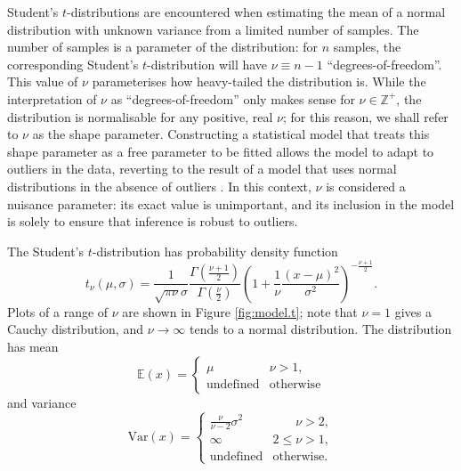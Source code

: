 \documentclass[fleqn,usenatbib]{mnras}
\newcommand{\studentt}[2]{t_\nu \left( #1, #2 \right)}
\begin{document}
Student's $t$-distributions are encountered when estimating the mean of a normal
distribution with unknown variance from a limited number of samples. The number
of samples is a parameter of the distribution: for $n$ samples, the
corresponding Student's $t$-distribution will have $\nu \equiv n - 1$
``degrees-of-freedom''. This value of $\nu$ parameterises how heavy-tailed the
distribution is. While the interpretation of $\nu$ as ``degrees-of-freedom''
only makes sense for $\nu \in \mathbb Z^+$, the distribution is normalisable for
any positive, real $\nu$; for this reason, we shall refer to $\nu$ as the shape
parameter. Constructing a statistical model that treats this shape parameter as
a free parameter to be fitted allows the model to adapt to outliers in the data,
reverting to the result of a model that uses normal distributions in the absence
of outliers \citep{Feeney:2018}. In this context, $\nu$ is considered a
nuisance parameter: its exact value is unimportant, and its inclusion in the
model is solely to ensure that inference is robust to outliers.

The Student's $t$-distribution has probability density function
\begin{equation}
    \studentt{\mu}{\sigma}
        =
    \frac{1}{\sqrt{\pi \nu} \sigma}
    \frac{
        \Gamma \left(\frac{\nu + 1}2\right)
    }{
        \Gamma \left(\frac{\nu}2\right)
    }
    \left(
        1 + \frac{1}{\nu} \frac{\left(x - \mu\right)^2}{\sigma^2}
    \right)^{
        -\frac{\nu + 1}{2}
    }.
\end{equation}
Plots of a range of $\nu$ are shown in Figure \ref{fig:model.t}; note that $\nu
= 1$ gives a Cauchy distribution, and $\nu \rightarrow \infty$ tends to a normal
distribution. The distribution has mean
\begin{equation}
    \mathbb{E}(x)
        =
    \begin{cases}
        \mu & \nu > 1, \\
        \textrm{undefined} & \textrm{otherwise}
    \end{cases}
\end{equation}
and variance
\begin{equation}
    \mathrm{Var}(x)
        =
    \begin{cases}
        \frac{\nu}{\nu - 2} \sigma^2 & \phantom{2 \leq} \nu > 2, \\
        \infty & 2 \leq \nu > 1, \\
        \textrm{undefined} & \textrm{otherwise.}
    \end{cases}
\end{equation}
\end{document}
